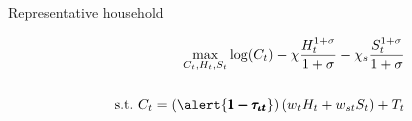 \documentclass[11pt,aspectratio=169]{beamer}
\begin{document}
\begin{frame}{Representative household}
	\hypertarget{backhh}{}
	\vspace{2mm}
	\begin{minipage}[t!]{1\textwidth}
		\begin{align*}
			\max_{C_t, H_{t}, S_{t}} \log(C_t)-\chi\frac{H_{t}^{1+\sigma}}{1+\sigma}-\chi_s\frac{S_{t}^{1+\sigma}}{1+\sigma}
			\\
			\vspace{4mm}
			\\
			\text{s.t.}\ C_t=(\alert{\pmb{1-\tau_{\iota t}}})\left(w_{t}H_{t}+w_{st}S_t\right)+T_t%
		\end{align*}
	\end{minipage}
	

\end{frame}
\end{document}

